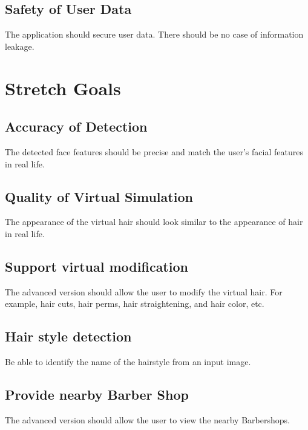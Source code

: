 \documentclass{article}
\begin{document}
\subsection{Safety of User Data}
The application should secure user data. There should be no case of information leakage.

\section{Stretch Goals}

\subsection{Accuracy of Detection}
The detected face features should be precise and match the user's facial features in real life.

\subsection{Quality of Virtual Simulation}
The appearance of the virtual hair should look similar to the appearance of hair in real life.

\subsection{Support virtual modification}
The advanced version should allow the user to modify the virtual hair. For example, hair cuts, hair perms, hair straightening, and hair color, etc. 

\subsection{Hair style detection}
Be able to identify the name of the hairstyle from an input image.

\subsection{Provide nearby Barber Shop}
The advanced version should allow the user to view the nearby Barbershops.
\end{document}

